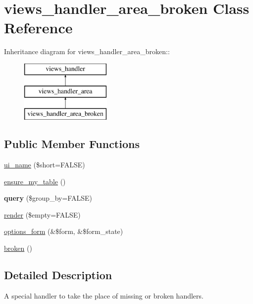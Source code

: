 \hypertarget{classviews__handler__area__broken}{
\section{views\_\-handler\_\-area\_\-broken Class Reference}
\label{classviews__handler__area__broken}
}
Inheritance diagram for views\_\-handler\_\-area\_\-broken::\begin{figure}[H]
\begin{center}
\leavevmode
\includegraphics[height=3cm]{classviews__handler__area__broken}
\end{center}
\end{figure}
\subsection*{Public Member Functions}
\begin{DoxyCompactItemize}
\item 
\hyperlink{classviews__handler__area__broken_a73198c332f1b3e2c9b5fcd719a4f4fb7}{ui\_\-name} (\$short=FALSE)
\item 
\hyperlink{classviews__handler__area__broken_acd6bec7fca60efb5ae6fa4f37a77a9f6}{ensure\_\-my\_\-table} ()
\item 
\hypertarget{classviews__handler__area__broken_a12bd79d61b321a76f88b929d4f98cd10}{
{\bfseries query} (\$group\_\-by=FALSE)}
\label{classviews__handler__area__broken_a12bd79d61b321a76f88b929d4f98cd10}

\item 
\hyperlink{classviews__handler__area__broken_aa56616948891521539f0f4b59e20307f}{render} (\$empty=FALSE)
\item 
\hyperlink{classviews__handler__area__broken_ac5f35dab0c0f8a2486e570fa8ec4e85a}{options\_\-form} (\&\$form, \&\$form\_\-state)
\item 
\hyperlink{classviews__handler__area__broken_ab7a2b86712be49f469134c315e8907ef}{broken} ()
\end{DoxyCompactItemize}


\subsection{Detailed Description}
A special handler to take the place of missing or broken handlers. 

